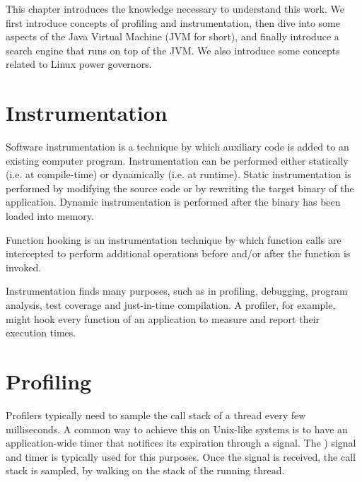 
This chapter introduces the knowledge necessary to understand this work. We first introduce concepts of profiling and instrumentation, then dive into some aspects of the Java Virtual Machine (JVM for short), and finally introduce a search engine that runs on top of the JVM. We also introduce some concepts related to Linux power governors.

\section{Instrumentation}

Software instrumentation is a technique by which auxiliary code is added to an existing computer program. Instrumentation can be performed either statically (i.e. at compile-time) or dynamically (i.e. at runtime). Static instrumentation is performed by modifying the source code or by rewriting the target binary of the application. Dynamic instrumentation is performed after the binary has been loaded into memory.

Function hooking is an instrumentation technique by which function calls are intercepted to perform additional operations before and/or after the function is invoked.

Instrumentation finds many purposes, such as in profiling, debugging, program analysis, test coverage and just-in-time compilation. A profiler, for example, might hook every function of an application to measure and report their execution times.



\section{Profiling}






\iffalse
Profilers typically need to sample the call stack of a thread every few milliseconds. A common way to achieve this on Unix-like systems is to have an application-wide timer that notifices its expiration through a signal. The ) signal and  timer is typically used for this purposes. Once the signal is received, the call stack is sampled, by walking on the stack of the running thread.

